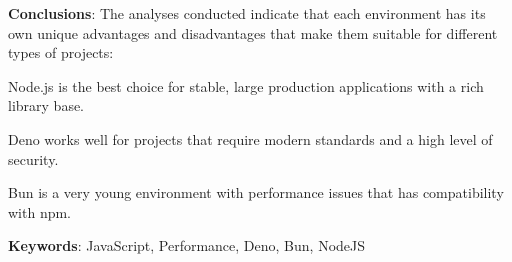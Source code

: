 \textbf{Conclusions}: The analyses conducted indicate that each environment has its own unique advantages and disadvantages that make them suitable for different types of projects:

Node.js is the best choice for stable, large production applications with a rich library base.

Deno works well for projects that require modern standards and a high level of security.

Bun is a very young environment with performance issues that has compatibility with npm.

\bigskip

\textbf{Keywords}: JavaScript, Performance, Deno, Bun, NodeJS
